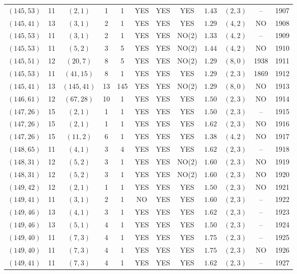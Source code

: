\begin{longtable}{|c|c|c|c|c|c|c|c|c|c|c|c|}
$(145,53)$ & 11 & $(2,1)$ & 1 & 1 & YES & YES & YES & $1.43$ & $(2,3)$ & -- & 1907\\
$(145,41)$ & 13 & $(3,1)$ & 2 & 1 & YES & YES & YES & $1.29$ & $(4,2)$ & NO & 1908\\
$(145,53)$ & 11 & $(3,1)$ & 2 & 1 & YES & YES & NO(2) & $1.33$ & $(4,2)$ & -- & 1909\\
$(145,53)$ & 11 & $(5,2)$ & 3 & 5 & YES & YES & NO(2) & $1.44$ & $(4,2)$ & NO & 1910\\
$(145,51)$ & 12 & $(20,7)$ & 8 & 5 & YES & YES & NO(2) & $1.29$ & $(8,0)$ & 1938 & 1911\\
$(145,53)$ & 11 & $(41,15)$ & 8 & 1 & YES & YES & YES & $1.29$ & $(2,3)$ & 1869 & 1912\\
$(145,41)$ & 13 & $(145,41)$ & 13 & 145 & YES & YES & NO(2) & $1.29$ & $(8,0)$ & NO & 1913\\
$(146,61)$ & 12 & $(67,28)$ & 10 & 1 & YES & YES & YES & $1.50$ & $(2,3)$ & NO & 1914\\
$(147,26)$ & 15 & $(2,1)$ & 1 & 1 & YES & YES & YES & $1.50$ & $(2,3)$ & -- & 1915\\
$(147,26)$ & 15 & $(2,1)$ & 1 & 1 & YES & YES & YES & $1.62$ & $(2,3)$ & NO & 1916\\
$(147,26)$ & 15 & $(11,2)$ & 6 & 1 & YES & YES & YES & $1.38$ & $(4,2)$ & NO & 1917\\
$(148,65)$ & 11 & $(4,1)$ & 3 & 4 & YES & YES & YES & $1.62$ & $(2,3)$ & -- & 1918\\
$(148,31)$ & 12 & $(5,2)$ & 3 & 1 & YES & YES & NO(2) & $1.60$ & $(2,3)$ & NO & 1919\\
$(148,31)$ & 12 & $(5,2)$ & 3 & 1 & YES & YES & NO(2) & $1.60$ & $(2,3)$ & NO & 1920\\
$(149,42)$ & 12 & $(2,1)$ & 1 & 1 & YES & YES & YES & $1.50$ & $(2,3)$ & NO & 1921\\
$(149,41)$ & 11 & $(3,1)$ & 2 & 1 & NO & YES & YES & $1.60$ & $(2,3)$ & -- & 1922\\
$(149,46)$ & 13 & $(4,1)$ & 3 & 1 & YES & YES & YES & $1.62$ & $(2,3)$ & -- & 1923\\
$(149,46)$ & 13 & $(5,1)$ & 4 & 1 & YES & YES & YES & $1.50$ & $(2,3)$ & -- & 1924\\
$(149,40)$ & 11 & $(7,3)$ & 4 & 1 & YES & YES & YES & $1.75$ & $(2,3)$ & -- & 1925\\
$(149,40)$ & 11 & $(7,3)$ & 4 & 1 & YES & YES & YES & $1.75$ & $(2,3)$ & NO & 1926\\
$(149,41)$ & 11 & $(7,3)$ & 4 & 1 & YES & YES & YES & $1.62$ & $(2,3)$ & -- & 1927\\

\end{longtable}
